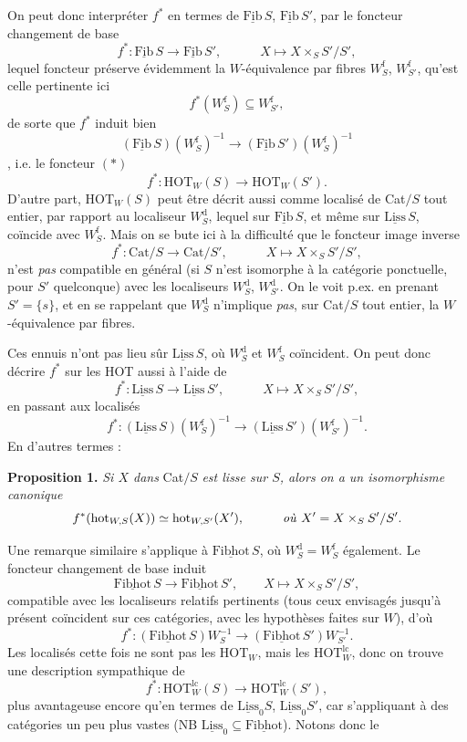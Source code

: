 \documentclass[11pt]{article}
\newcommand{\printedpage}[1]{\marginpar{\footnotesize p.~#1}}
\newcommand{\msp}[1]{\marginpar{\footnotesize [#1]}}
\newcommand{\HOT}{\mathrm{HOT}}
\newcommand{\Cat}{\mathrm{Cat}}
\newcommand{\hot}{\mathrm{hot}}
\newcommand{\Fib}{\underline{\mathrm{Fib}}\,}
\newcommand{\Liss}{\underline{\mathrm{Liss}}}
\newcommand{\und}[1]{\underline{\mathrm{#1}}}
\begin{document}
On peut donc interpréter $f^*$ en termes de $\Fib S$, $\Fib S'$, par le foncteur changement de base
\[f^* : \Fib S \longrightarrow \Fib S', \qquad\quad X \longmapsto X \times_S S'/S',\]
lequel foncteur préserve évidemment la $W$-équivalence par fibres $W_S^{\mathrm{f}}$, $W_{S'}^{\mathrm{f}}$, qu'est celle pertinente ici
\[f^*(W_S^{\mathrm{f}}) \subseteq W_{S'}^{\mathrm{f}},\]
de sorte que $f^*$ induit bien
\[(\Fib S)(W_S^{\mathrm{f}})^{-1} \longrightarrow (\Fib S')(W_S^{\mathrm{f}})^{-1}\]
,
\msp{page 118}
i.e. le foncteur $(*)$
\[f^* : \HOT_W(S) \longrightarrow \HOT_W(S').\]
D'autre part, $\HOT_W(S)$ peut être décrit aussi comme localisé de Cat$/S$ tout entier, par rapport au localiseur $W_S^{\mathrm{d}}$, lequel sur $\Fib S$, et même sur $\Liss\,S$, coïncide avec $W_S^{\mathrm{f}}$. Mais on se bute ici à la difficulté que le foncteur image inverse
\[f^* : \Cat/S \longrightarrow \Cat/S', \qquad\quad X \longmapsto X \times_S S'/S',\]
n'est \textit{pas} compatible en général (si $S$ n'est isomorphe à la catégorie ponctuelle, pour $S'$ quelconque) avec les localiseurs $W_S^{\mathrm{d}}$, $W_{S'}^{\mathrm{d}}$. On le voit p.ex. en prenant $S' = \{s\}$, et en se rappelant que $W_S^{\mathrm{d}}$ n'implique \textit{pas}, sur Cat$/S$ tout entier, la $W$-équivalence par fibres.

Ces ennuis n'ont pas lieu sûr $\Liss\,S$, où $W_S^{\mathrm{d}}$ et $W_S^{\mathrm{f}}$ coïncident. On peut donc décrire $f^*$ sur les HOT aussi à l'aide de %
\[f^* : \Liss\,S \longrightarrow \Liss\,S', \qquad\quad X \longmapsto X \times_S S'/S',\]
en passant aux localisés
\[f^* : (\Liss\,S)(W_S^{\mathrm{f}})^{-1} \longrightarrow (\Liss\,S')(W_{S'}^{\mathrm{f}})^{-1}.\]
En d'autres termes :

\textbf{Proposition 1.} \textit{Si $X$ dans} Cat$/S$ \textit{est lisse sur $S$, alors on a un isomorphisme canonique}
\[f^*(\hot_{W,S}(X)) \simeq \hot_{W,S'}(X'), \qquad\quad \text{\textit{où} } X' = X \times_S S'/S'.\]

\printedpage{74}

\msp{page 119}
Une remarque similaire s'applique à $\und{Fibhot}\,S$, où $W_S^{\mathrm{d}} = W_S^{\mathrm{f}}$ également. Le foncteur changement de base induit
\[
\und{Fibhot}\,S \longrightarrow \und{Fibhot}\,S', \qquad X \longmapsto X \times_S S'/S',
\]
compatible avec les localiseurs relatifs pertinents (tous ceux envisagés jusqu'à présent coïncident sur ces catégories, avec les hypothèses faites sur $W$), d'où
\[
f^* : (\und{Fibhot}\,S)W_S^{-1} \longrightarrow (\und{Fibhot}\,S')W_{S'}^{-1}.
\]
Les localisés cette fois ne sont pas les $\HOT_W$, mais les $\HOT_W^{\mathrm{lc}}$, donc on trouve une description sympathique de
\[
f^* : \HOT_W^{\mathrm{lc}}(S) \longrightarrow \HOT_W^{\mathrm{lc}}(S'),
\]
plus avantageuse encore qu'en termes de $\und{Liss}_0S$, $\und{Liss}_0S'$, car s'appliquant à des catégories un peu plus vastes (NB $\und{Liss}_0 \subseteq \und{Fibhot}$). Notons donc le
\end{document}
